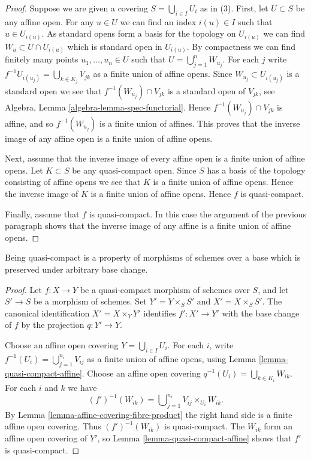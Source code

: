 \begin{proof}
Suppose we are given a covering $S = \bigcup_{i \in I} U_i$ as in (3).
First, let $U \subset S$ be any affine open. For any $u \in U$
we can find an index $i(u) \in I$ such that $u \in U_{i(u)}$.
As standard opens form a basis for the topology on $U_{i(u)}$ we can find
$W_u \subset U \cap U_{i(u)}$ which is standard open in $U_{i(u)}$.
By compactness we can find finitely many points $u_1, \ldots, u_n \in U$
such that $U = \bigcup_{j = 1}^n W_{u_j}$. For each $j$ write
$f^{-1}U_{i(u_j)} = \bigcup_{k \in K_j} V_{jk}$ as a finite
union of affine opens. Since $W_{u_j} \subset U_{i(u_j)}$ is a standard
open we see that $f^{-1}(W_{u_j}) \cap V_{jk}$ is a standard
open of $V_{jk}$, see Algebra, Lemma \ref{algebra-lemma-spec-functorial}.
Hence $f^{-1}(W_{u_j}) \cap V_{jk}$ is affine, and so
$f^{-1}(W_{u_j})$ is a finite union of affines. This proves that the
inverse image of any affine open is a finite union of affine opens.

\medskip\noindent
Next, assume that the inverse image of every affine open is a finite
union of affine opens.
Let $K \subset S$ be any quasi-compact open. Since $S$ has a basis
of the topology consisting of affine opens we see that $K$ is a finite
union of affine opens. Hence the inverse image of $K$ is a finite
union of affine opens. Hence $f$ is quasi-compact.

\medskip\noindent
Finally, assume that $f$ is quasi-compact. In this case the argument
of the previous paragraph shows that the inverse image of any affine
is a finite union of affine opens.
\end{proof}

\begin{lemma}
\label{lemma-quasi-compact-preserved-base-change}
Being quasi-compact is a property of morphisms of schemes
over a base which is preserved under arbitrary base change.
\end{lemma}

\begin{proof}
Let $f : X \to Y$ be a quasi-compact morphism of schemes over $S$,
and let $S' \to S$ be a morphism of schemes. Set
$Y' = Y \times_S S'$ and $X' = X \times_S S'$.
The canonical identification $X' = X \times_Y Y'$ identifies
$f' : X' \to Y'$ with the base change of $f$ by the projection
$q : Y' \to Y$.

Choose an affine open covering $Y = \bigcup_{i \in I} U_i$.
For each $i$, write $f^{-1}(U_i) = \bigcup_{j = 1}^{n_i} V_{ij}$
as a finite union of affine opens, using
Lemma \ref{lemma-quasi-compact-affine}.
Choose an affine open covering
$q^{-1}(U_i) = \bigcup_{k \in K_i} W_{ik}$.
For each $i$ and $k$ we have
$$
(f')^{-1}(W_{ik}) =
\bigcup\nolimits_{j = 1}^{n_i} V_{ij} \times_{U_i} W_{ik}.
$$
By Lemma \ref{lemma-affine-covering-fibre-product}
the right hand side is a finite affine open covering.
Thus $(f')^{-1}(W_{ik})$ is quasi-compact.
The $W_{ik}$ form an affine open covering of $Y'$, so
Lemma \ref{lemma-quasi-compact-affine} shows that $f'$ is quasi-compact.
\end{proof}

